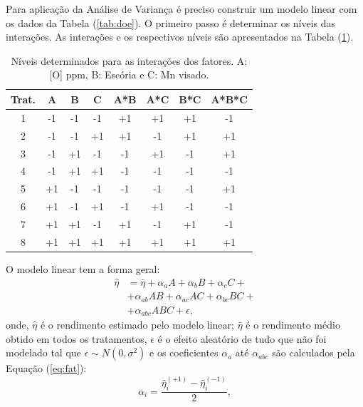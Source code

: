 		Para aplicação da Análise de Variança é preciso construir um modelo linear com os dados da Tabela (\ref{tab:doe}). O primeiro passo é determinar os níveis das interações. As interações e os respectivos níveis são apresentados na Tabela (\ref{tab:inter}).		
		\begin{table}[H]
		\caption{Níveis determinados para as interações dos fatores. A: [O] ppm, B: Escória e C: Mn visado.}
		\label{tab:inter}
			\begin{center}
			\begin{footnotesize}
				\begin{tabular}[c]{cccc|cccc}
				\hline
				Trat. & A & B & C & A*B & A*C & B*C & A*B*C \\
				\hline \hline
				1&-1&-1&-1&+1&+1&+1&-1	\\
				2&-1&-1&+1&+1&-1&+1&+1	\\
				3&-1&+1&-1&-1&+1&-1&+1	\\
				4&-1&+1&+1&-1&-1&-1&-1	\\
				5&+1&-1&-1&-1&-1&-1&+1	\\
				6&+1&-1&+1&-1&+1&-1&-1	\\
				7&+1&+1&-1&+1&-1&+1&-1	\\
				8&+1&+1&+1&+1&+1&+1&+1	\\
				\hline
				\end{tabular}
			\end{footnotesize}
			\end{center}
		\end{table}
		O modelo linear tem a forma geral:
		\begin{equation}
		\begin{split}
		\label{eq:modelo}
			\hat{\eta} &= \bar{\eta} + \alpha_a A + \alpha_b B + \alpha_c C + \\ & + \alpha_{ab} AB + \alpha_{ac} AC + \alpha_{bc} BC + \\ & +  \alpha_{abc} ABC +\epsilon,
		\end{split}
		\end{equation}
		\noindent onde, $\hat{\eta}$ é o rendimento estimado pelo modelo linear; $\bar{\eta}$ é o rendimento médio obtido em todos os tratamentos, $\epsilon$ é o efeito aleatório de tudo que não foi modelado tal que $\epsilon \sim N(0, \sigma^2)$ e os coeficientes $\alpha_a$ até $\alpha_{abc}$ são calculados pela Equação (\ref{eq:fat}):
		\begin{equation}
		\label{eq:fat}
			\alpha_i = \frac{\hat{\eta}_i^{(+1)} - \hat{\eta}_i^{(-1)} }{2},
		\end{equation}
